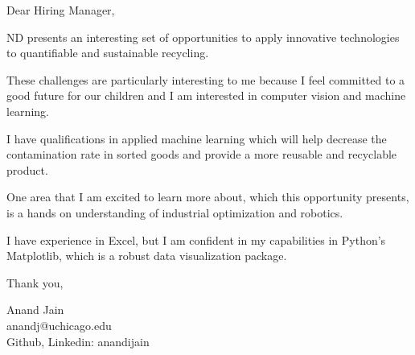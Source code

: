 \documentclass[11pt,a4paper]{letter} %
\begin{document}
Dear Hiring Manager,

ND presents an interesting set of opportunities to apply innovative technologies to quantifiable and sustainable recycling. 

These challenges are particularly interesting to me because I feel committed to a good future for our children and I am interested in computer vision and machine learning. 

I have qualifications in applied machine learning which will help decrease the contamination rate in sorted goods and provide a more reusable and recyclable product. 

One area that I am excited to learn more about, which this opportunity presents, is a hands on understanding of industrial optimization and robotics.

I have experience in Excel, but I am confident in my capabilities in Python’s Matplotlib, which is a robust data visualization package.

Thank you, 

Anand Jain\\
anandj@uchicago.edu\\
Github, Linkedin: anandijain
\end{document}
